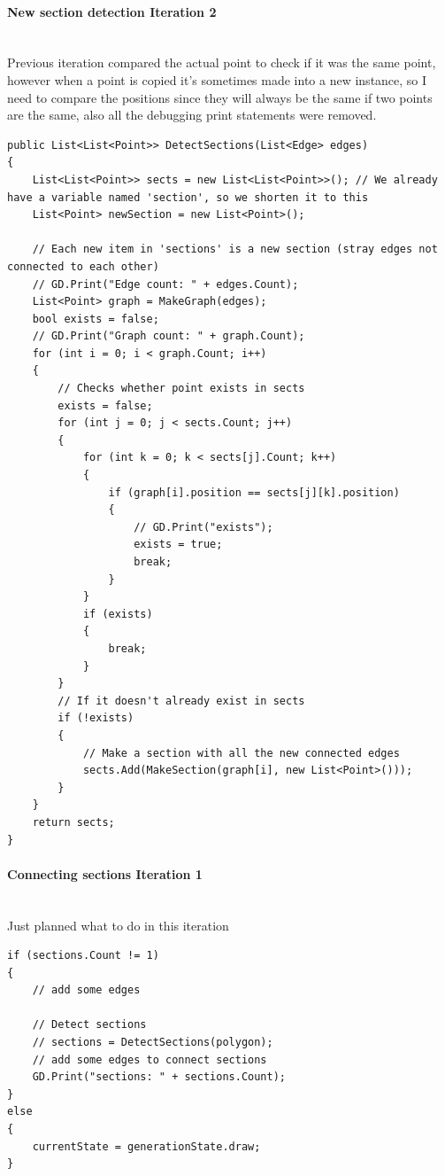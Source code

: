 \documentclass{article}
\newcommand{\myparagraph}[1]{\paragraph{#1}\mbox{}\\} %
\begin{document}
\myparagraph{New section detection Iteration 2}
Previous iteration compared the actual point to check if it was the same point, however when a point is copied it's sometimes made into a new instance, so I need to compare the positions since they will always be the same if two points are the same, also all the debugging print statements were removed.
\begin{lstlisting}
public List<List<Point>> DetectSections(List<Edge> edges)
{
    List<List<Point>> sects = new List<List<Point>>(); // We already have a variable named 'section', so we shorten it to this
    List<Point> newSection = new List<Point>();

    // Each new item in 'sections' is a new section (stray edges not connected to each other)
    // GD.Print("Edge count: " + edges.Count);
    List<Point> graph = MakeGraph(edges);
    bool exists = false;
    // GD.Print("Graph count: " + graph.Count);
    for (int i = 0; i < graph.Count; i++)
    {
        // Checks whether point exists in sects
        exists = false;
        for (int j = 0; j < sects.Count; j++)
        {
            for (int k = 0; k < sects[j].Count; k++)
            {
                if (graph[i].position == sects[j][k].position)
                {
                    // GD.Print("exists");
                    exists = true;
                    break;
                }
            }
            if (exists)
            {
                break;
            }
        }
        // If it doesn't already exist in sects
        if (!exists)
        {
            // Make a section with all the new connected edges
            sects.Add(MakeSection(graph[i], new List<Point>()));
        }
    }
    return sects;
}
\end{lstlisting}

\myparagraph{Connecting sections Iteration 1}
Just planned what to do in this iteration
\begin{lstlisting}
if (sections.Count != 1)
{
    // add some edges
                
    // Detect sections
    // sections = DetectSections(polygon);
    // add some edges to connect sections
    GD.Print("sections: " + sections.Count);
}
else
{
    currentState = generationState.draw;
}

\end{lstlisting}
\end{document}

